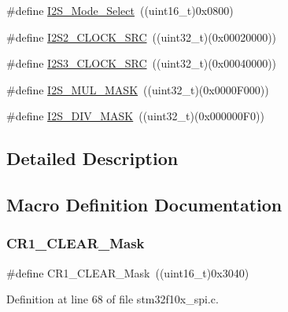 \begin{DoxyCompactItemize}
\item 
\#define \hyperlink{group___s_p_i___private___defines_ga196b1b58421a7ee7dba0b46fb33c621b}{I2\+S\+\_\+\+Mode\+\_\+\+Select}~((uint16\+\_\+t)0x0800)
\item 
\#define \hyperlink{group___s_p_i___private___defines_gae1190efd6dbcd06a9c03f4d499d28e4c}{I2\+S2\+\_\+\+C\+L\+O\+C\+K\+\_\+\+S\+RC}~((uint32\+\_\+t)(0x00020000))
\item 
\#define \hyperlink{group___s_p_i___private___defines_gabb67971448c15090f3372e3875db3d23}{I2\+S3\+\_\+\+C\+L\+O\+C\+K\+\_\+\+S\+RC}~((uint32\+\_\+t)(0x00040000))
\item 
\#define \hyperlink{group___s_p_i___private___defines_gaf9cca755995c8e8f7a4012709ca468f2}{I2\+S\+\_\+\+M\+U\+L\+\_\+\+M\+A\+SK}~((uint32\+\_\+t)(0x0000\+F000))
\item 
\#define \hyperlink{group___s_p_i___private___defines_ga26cdb43c45ac655c792c5af0a6bbb0bf}{I2\+S\+\_\+\+D\+I\+V\+\_\+\+M\+A\+SK}~((uint32\+\_\+t)(0x000000\+F0))
\end{DoxyCompactItemize}


\subsection{Detailed Description}


\subsection{Macro Definition Documentation}
\mbox{\label{group___s_p_i___private___defines_ga67f7dd35ea3d1296677e5fc50b88fa90}} 
\subsubsection{\texorpdfstring{C\+R1\+\_\+\+C\+L\+E\+A\+R\+\_\+\+Mask}{CR1\_CLEAR\_Mask}}
{\footnotesize\ttfamily \#define C\+R1\+\_\+\+C\+L\+E\+A\+R\+\_\+\+Mask~((uint16\+\_\+t)0x3040)}



Definition at line 68 of file stm32f10x\+\_\+spi.\+c.

\mbox{\label{group___s_p_i___private___defines_gadd72ac04e7b2ff17053db04d240e17b1}} 
